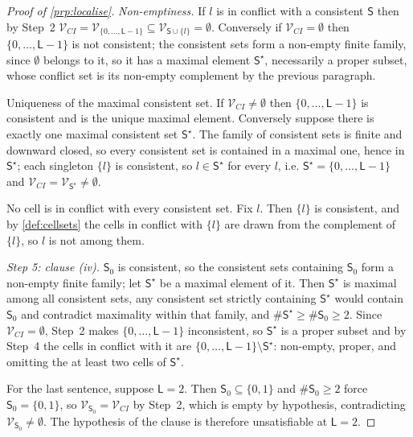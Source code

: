 \begin{proof}[Proof of \cref{prp:localise}]
\emph{Non-emptiness.} If $l$ is in conflict with a consistent $\mathsf S$ then by Step~2
$\mathcal V_{CI}=\mathcal V_{\{0,\dots,\mathsf L-1\}}\subseteq\mathcal V_{\mathsf S\cup\{l\}}=\emptyset$.
Conversely if $\mathcal V_{CI}=\emptyset$ then $\{0,\dots,\mathsf L-1\}$ is not consistent; the
consistent sets form a non-empty finite family, since $\emptyset$ belongs to it, so it has a maximal
element $\mathsf S^{\star}$, necessarily a proper subset, whose conflict set is its non-empty
complement by the previous paragraph.

Uniqueness of the maximal consistent set. If $\mathcal V_{CI}\neq\emptyset$ then
$\{0,\dots,\mathsf L-1\}$ is consistent and is the unique maximal element. Conversely suppose there is
exactly one maximal consistent set $\mathsf S^{\star}$. The family of consistent sets is finite and
downward closed, so every consistent set is contained in a maximal one, hence in $\mathsf S^{\star}$;
each singleton $\{l\}$ is consistent, so $l\in\mathsf S^{\star}$ for every $l$, i.e.
$\mathsf S^{\star}=\{0,\dots,\mathsf L-1\}$ and $\mathcal V_{CI}=\mathcal V_{\mathsf S^{\star}}\neq\emptyset$.

No cell is in conflict with every consistent set. Fix $l$. Then $\{l\}$ is consistent, and by
\cref{def:cellsets} the cells in conflict with $\{l\}$ are drawn from the complement of $\{l\}$, so
$l$ is not among them.

\emph{Step 5: clause \textup{(iv)}.} $\mathsf S_0$ is consistent, so the consistent sets containing
$\mathsf S_0$ form a non-empty finite family; let $\mathsf S^{\star}$ be a maximal element of it. Then
$\mathsf S^{\star}$ is maximal among all consistent sets, any consistent set strictly containing
$\mathsf S^{\star}$ would contain $\mathsf S_0$ and contradict maximality within that family, and
$\#\mathsf S^{\star}\ge\#\mathsf S_0\ge2$. Since $\mathcal V_{CI}=\emptyset$, Step~2 makes
$\{0,\dots,\mathsf L-1\}$ inconsistent, so $\mathsf S^{\star}$ is a proper subset and by Step~4 the
cells in conflict with it are $\{0,\dots,\mathsf L-1\}\setminus\mathsf S^{\star}$: non-empty, proper,
and omitting the at least two cells of $\mathsf S^{\star}$.

For the last sentence, suppose $\mathsf L=2$. Then $\mathsf S_0\subseteq\{0,1\}$ and
$\#\mathsf S_0\ge2$ force $\mathsf S_0=\{0,1\}$, so $\mathcal V_{\mathsf S_0}=\mathcal V_{CI}$ by
Step~2, which is empty by hypothesis, contradicting $\mathcal V_{\mathsf S_0}\neq\emptyset$. The
hypothesis of the clause is therefore unsatisfiable at $\mathsf L=2$.


\end{proof}
